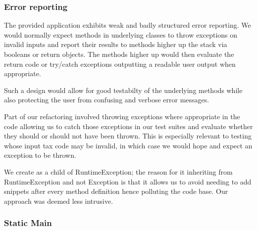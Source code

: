\subsubsection{Error reporting}
\label{sec:error-reporting}
The provided application exhibits weak and badly structured error reporting. We would normally expect methods in underlying classes to throw exceptions on invalid inputs and report their results to methods higher up the stack via booleans or return objects. The methods higher up would then evaluate the return code or try/catch exceptions outputting a readable user output when appropriate.
\par
Such a design would allow for good testabilty of the underlying methods while also protecting the user from confusing and verbose error messages. 
\par 
Part of our refactoring involved throwing exceptions where appropriate in the code allowing us to catch those exceptions in our test suites and evaluate whether they should or should not have been thrown. 
This is especially relevant to testing  whose input tax code may be invalid, in which case we would hope and expect an exception to be thrown. 
\par 
We create  as a child of RuntimeException; the reason for it inheriting from RuntimeException and not Exception is that it allows us to avoid needing to add snippets  after every method definition hence polluting the code base. 
Our approach was deemed less intrusive. 

\subsubsection{Static Main}

